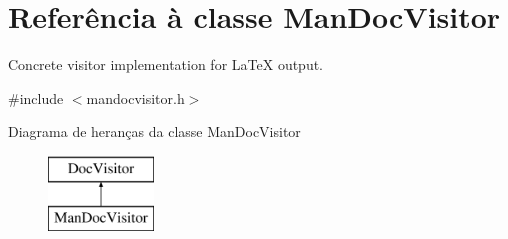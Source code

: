 \hypertarget{class_man_doc_visitor}{\section{Referência à classe Man\-Doc\-Visitor}
\label{class_man_doc_visitor}
}


Concrete visitor implementation for La\-Te\-X output.  




{\ttfamily \#include $<$mandocvisitor.\-h$>$}

Diagrama de heranças da classe Man\-Doc\-Visitor\begin{figure}[H]
\begin{center}
\leavevmode
\includegraphics[height=2.000000cm]{class_man_doc_visitor}
\end{center}
\end{figure}
